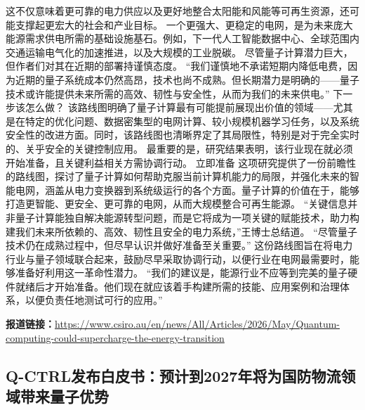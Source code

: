 \documentclass[12pt,a4paper]{ctexart}
\begin{document}
这不仅意味着更可靠的电力供应以及更好地整合太阳能和风能等可再生资源，还可能支撑起更宏大的社会和产业目标。
一个更强大、更稳定的电网，是为未来庞大能源需求供电所需的基础设施基石。例如，下一代人工智能数据中心、全球范围内交通运输电气化的加速推进，以及大规模的工业脱碳。
尽管量子计算潜力巨大，但作者们对其在近期的部署持谨慎态度。
“我们谨慎地不承诺短期内降低电费，因为近期的量子系统成本仍然高昂，技术也尚不成熟。但长期潜力是明确的——量子技术或许能提供未来所需的高效、韧性与安全性，从而为我们的未来供电。”
下一步该怎么做？
该路线图明确了量子计算最有可能提前展现出价值的领域——尤其是在特定的优化问题、数据密集型的电网计算、较小规模机器学习任务，以及系统安全性的改进方面。同时，该路线图也清晰界定了其局限性，特别是对于完全实时的、关乎安全的关键控制应用。
最重要的是，研究结果表明，该行业现在就必须开始准备，且关键利益相关方需协调行动。
立即准备
这项研究提供了一份前瞻性的路线图，探讨了量子计算如何帮助克服当前计算机能力的局限，并强化未来的智能电网，涵盖从电力变换器到系统级运行的各个方面。量子计算的价值在于，能够打造更智能、更安全、更可靠的电网，从而大规模整合可再生能源。
“关键信息并非量子计算能独自解决能源转型问题，而是它将成为一项关键的赋能技术，助力构建我们未来所依赖的、高效、韧性且安全的电力系统，”王博士总结道。
“尽管量子技术仍在成熟过程中，但尽早认识并做好准备至关重要。”
这份路线图旨在将电力行业与量子领域联合起来，鼓励尽早采取协调行动，以便行业在电网最需要时，能够准备好利用这一革命性潜力。
“我们的建议是，能源行业不应等到完美的量子硬件就绪后才开始准备。他们现在就应该着手构建所需的技能、应用案例和治理体系，以便负责任地测试可行的应用。”

\noindent\textbf{报道链接：}\url{https://www.csiro.au/en/news/All/Articles/2026/May/Quantum-computing-could-supercharge-the-energy-transition}

\subsection{ Q-CTRL发布白皮书：预计到2027年将为国防物流领域带来量子优势 }
\end{document}
